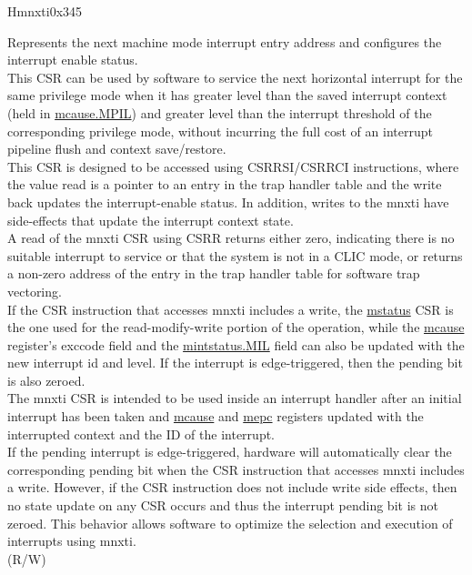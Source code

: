 \begin{register}{H}{mnxti}{0x345}\label{regdesc:MNXTI_REG}
%
\regnewline%
\begin{regdesc}\begin{reglist}
\label{fielddesc:MNXTI}\item [MNXTI]
Represents the next machine mode interrupt entry address and configures the interrupt enable status.\\
This CSR can be used by software to service the next horizontal interrupt for the same privilege mode when it has greater level than the saved interrupt context (held in \hyperref[fielddesc:MCAUSE_MPIL]{{mcause.MPIL}}) and greater level than the interrupt threshold of the corresponding privilege mode, without incurring the full cost of an interrupt pipeline flush and context save/restore.\\
This CSR is designed to be accessed using CSRRSI/CSRRCI instructions, where the value read is a pointer to an entry in the trap handler table and the write back updates the interrupt-enable status. In addition, writes to the mnxti have side-effects that update the interrupt context state.\\
A read of the mnxti CSR using CSRR returns either zero, indicating there is no suitable interrupt to service or that the system is not in a CLIC mode, or returns a non-zero address of the entry in the trap handler table for software trap vectoring.\\
If the CSR instruction that accesses mnxti includes a write, the \hyperref[regdesc:MSTATUS]{mstatus} CSR is the one used for the read-modify-write portion of the operation, while the \hyperref[regdesc:MCAUSE]{mcause} register’s exccode field and the \hyperref[fielddesc:MINTSTATUS_MIL]{mintstatus.MIL} field can also be updated with the new interrupt id and level. If the interrupt is edge-triggered, then the pending bit is also zeroed.\\
The mnxti CSR is intended to be used inside an interrupt handler after an initial interrupt has been taken and \hyperref[regdesc:MCAUSE]{mcause} and \hyperref[regdesc:MEPC]{mepc} registers updated with the interrupted context and the ID of the interrupt. \\
If the pending interrupt is edge-triggered, hardware will automatically clear the corresponding pending bit when the CSR instruction that accesses mnxti includes a write. However, if the CSR instruction does not include write side effects, then no state update on any CSR occurs and thus the interrupt pending bit is not zeroed. This behavior allows software to optimize the selection and execution of interrupts using mnxti.\\
(R/W)
\end{reglist}\end{regdesc}
\end{register}

